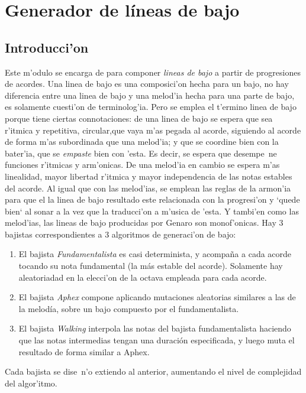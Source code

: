 ﻿\chapter{Generador de l\'ineas de bajo}
\section{Introducci'on}
Este m'odulo se encarga de para componer \emph{lineas de bajo} a partir de progresiones de acordes. Una linea de bajo es una composici'on hecha para un bajo, no hay diferencia entre una linea de bajo y una melod'ia hecha para una parte de bajo, es solamente cuesti'on de terminolog'ia. Pero se emplea el t'ermino linea de bajo porque tiene ciertas connotaciones: de una linea de bajo se espera que sea r'itmica y repetitiva, circular,que vaya m'as pegada al acorde, siguiendo al acorde de forma m'as subordinada que una melod'ia; y que se coordine bien con la bater'ia, que se \emph{empaste} bien con 'esta. Es decir, se espera que desempe~ne funciones r'itmicas y arm'onicas. De una melod'ia en cambio se espera m'as linealidad, mayor libertad r'itmica y mayor independencia de las notas estables del acorde.\newline
Al igual que con las melod'ias, se emplean las reglas de la armon'ia para que el la linea de bajo resultado este relacionada con la progresi'on y `quede bien` al sonar a la vez que la traducci'on a m'usica de 'esta. Y tambi'en como las melod'ias, las lineas de bajo producidas por Genaro son monof'onicas.\newline
Hay 3 bajistas correspondientes a 3 algoritmos de generaci'on de bajo: 
        \begin{enumerate}
        \item El bajista \emph{Fundamentalista} es casi determinista, y acompaña a cada acorde tocando su nota fundamental (la más estable del acorde). Solamente hay aleatoriadad en la elecci'on de la octava empleada para cada acorde.
        \item El bajista \emph{Aphex} compone aplicando mutaciones aleatorias similares a las de la melodía, sobre un bajo compuesto por el fundamentalista.
        \item El bajista \emph{Walking} interpola las notas del bajista fundamentalista haciendo que las notas intermedias tengan una duración especificada, y luego muta el resultado de forma similar a Aphex.
        \end{enumerate}
Cada bajista se dise~n'o extiendo al anterior, aumentando el nivel de complejidad del algor'itmo.
	
